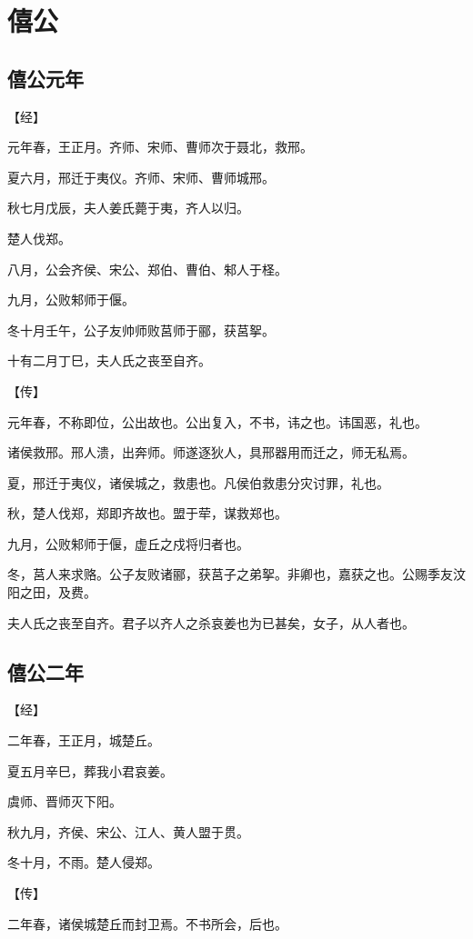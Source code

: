 \documentclass[a4paper,12pt,UTF8,twoside]{ctexbook}
\begin{document}
\chapter{僖公}

\section{僖公元年}

【经】

元年春，王正月。齐师、宋师、曹师次于聂北，救邢。

夏六月，邢迁于夷仪。齐师、宋师、曹师城邢。

秋七月戊辰，夫人姜氏薨于夷，齐人以归。

楚人伐郑。

八月，公会齐侯、宋公、郑伯、曹伯、邾人于柽。

九月，公败邾师于偃。

冬十月壬午，公子友帅师败莒师于郦，获莒挐。

十有二月丁巳，夫人氏之丧至自齐。

【传】

元年春，不称即位，公出故也。公出复入，不书，讳之也。讳国恶，礼也。

诸侯救邢。邢人溃，出奔师。师遂逐狄人，具邢器用而迁之，师无私焉。

夏，邢迁于夷仪，诸侯城之，救患也。凡侯伯救患分灾讨罪，礼也。

秋，楚人伐郑，郑即齐故也。盟于荦，谋救郑也。

九月，公败邾师于偃，虚丘之戍将归者也。

冬，莒人来求赂。公子友败诸郦，获莒子之弟挐。非卿也，嘉获之也。公赐季友汶阳之田，及费。

夫人氏之丧至自齐。君子以齐人之杀哀姜也为已甚矣，女子，从人者也。

\section{僖公二年}

【经】

二年春，王正月，城楚丘。

夏五月辛巳，葬我小君哀姜。

虞师、晋师灭下阳。

秋九月，齐侯、宋公、江人、黄人盟于贯。

冬十月，不雨。楚人侵郑。

【传】

二年春，诸侯城楚丘而封卫焉。不书所会，后也。
\end{document}
